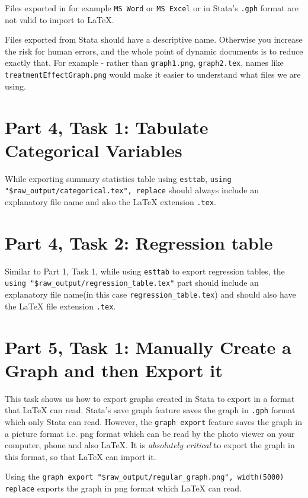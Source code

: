 \documentclass[]{article}
\begin{document}
Files exported in for example \texttt{MS Word} or \texttt{MS Excel} or in Stata's \texttt{.gph} format are not valid to import to {\LaTeX}.

Files exported from Stata should have a descriptive name. Otherwise you increase the risk for human errors, and the whole point of dynamic documents is to reduce exactly that. For example - rather than \texttt{graph1.png}, \texttt{graph2.tex}, names like \texttt{treatmentEffectGraph.png} would make it easier to understand what files we are using.

\section*{Part 4, Task 1: Tabulate Categorical Variables}

While exporting summary statistics table using \texttt{esttab}, \verb|using 	"$raw_output/categorical.tex", replace| should always include an explanatory file name and also the {\LaTeX} extension \texttt{.tex}.

\section*{Part 4, Task 2: Regression table}

Similar to Part 1, Task 1, while using \texttt{esttab} to export regression tables, the \verb|using "$raw_output/regression_table.tex"| part should include an explanatory file name(in this case \texttt{regression\_table.tex}) and should also have the {\LaTeX} file extension \texttt{.tex}.

\section*{Part 5, Task 1: Manually Create a Graph and then Export it}

This task shows us how to export graphs created in Stata to export in a format that {\LaTeX} can read. Stata's save graph feature saves the graph in \texttt{.gph} format which only Stata can read. However, the \texttt{graph export}  feature  saves the graph in a picture format i.e. png format which can be read by the photo viewer on your computer, phone and also {\LaTeX}. It is \emph{absolutely critical} to export the graph in this format, so that {\LaTeX} can import it. 

Using the \verb|graph export "$raw_output/regular_graph.png", width(5000) replace| 
exports the graph in png format which {\LaTeX} can read.
\end{document}
